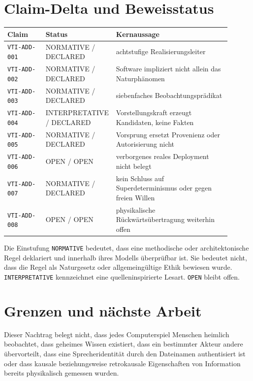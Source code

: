\documentclass[11pt,a4paper]{article}
\theoremstyle{remark}
\begin{document}
\section{Claim-Delta und Beweisstatus}

\begin{longtable}{@{}L{0.17\linewidth}L{0.22\linewidth}L{0.51\linewidth}@{}}
\toprule
\textbf{Claim} & \textbf{Status} & \textbf{Kernaussage} \\
\midrule
\endhead
\texttt{VTI-ADD-001} & NORMATIVE / DECLARED & achtstufige Realisierungsleiter \\
\texttt{VTI-ADD-002} & NORMATIVE / DECLARED & Software impliziert nicht allein das Naturphänomen \\
\texttt{VTI-ADD-003} & NORMATIVE / DECLARED & siebenfaches Beobachtungsprädikat \\
\texttt{VTI-ADD-004} & INTERPRETATIVE / DECLARED & Vorstellungskraft erzeugt Kandidaten, keine Fakten \\
\texttt{VTI-ADD-005} & NORMATIVE / DECLARED & Vorsprung ersetzt Provenienz oder Autorisierung nicht \\
\texttt{VTI-ADD-006} & OPEN / OPEN & verborgenes reales Deployment nicht belegt \\
\texttt{VTI-ADD-007} & NORMATIVE / DECLARED & kein Schluss auf Superdeterminismus oder gegen freien Willen \\
\texttt{VTI-ADD-008} & OPEN / OPEN & physikalische Rückwärtsübertragung weiterhin offen \\
\bottomrule
\end{longtable}

Die Einstufung \texttt{NORMATIVE} bedeutet, dass eine methodische oder
architektonische Regel deklariert und innerhalb ihres Modells überprüfbar
ist. Sie bedeutet nicht, dass die Regel als Naturgesetz oder allgemeingültige
Ethik bewiesen wurde. \texttt{INTERPRETATIVE} kennzeichnet eine
quelleninspirierte Lesart. \texttt{OPEN} bleibt offen.

\section{Grenzen und nächste Arbeit}

Dieser Nachtrag belegt nicht, dass jedes Computerspiel Menschen heimlich
beobachtet, dass geheimes Wissen existiert, dass ein bestimmter Akteur andere
übervorteilt, dass eine Sprecheridentität durch den Dateinamen authentisiert
ist oder dass kausale beziehungsweise retrokausale Eigenschaften von
Information bereits physikalisch gemessen wurden.
\end{document}
